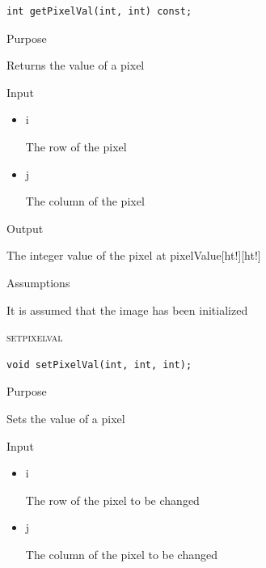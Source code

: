 \documentclass[pdftex, 11pt]{article}
\begin{document}
\begin{description}
\begin{description}
\begin{lstlisting}
int getPixelVal(int, int) const;
\end{lstlisting}

			\item{Purpose}

				Returns the value of a pixel

			\item{Input}

				\begin{itemize}

					\item{i}
					
						The row of the pixel

					\item{j} 

						The column of the pixel

				\end{itemize}

			\item{Output}

				The integer value of the pixel at 
				pixelValue[ht!][ht!]


			\item{Assumptions}

				It is assumed that the image has been initialized


		\end{description}


	\item{\textsc{setpixelval}}
		\begin{description}

\begin{lstlisting}
void setPixelVal(int, int, int);
\end{lstlisting}

			\item{Purpose}

				Sets the value of a pixel

			\item{Input}

				\begin{itemize}

					\item{i}

						The row of the pixel to be changed

					\item{j}

						The column of the pixel to be changed

				\end{itemize}


\end{description}
\end{description}
\end{document}
